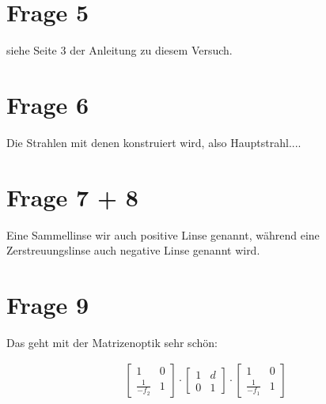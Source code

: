 \section{Frage 5}

siehe Seite 3 der Anleitung zu diesem Versuch.


\section{Frage 6}

Die Strahlen mit denen konstruiert wird, also Hauptstrahl....


\section{Frage 7 + 8}

Eine Sammellinse wir auch positive Linse genannt, während eine Zerstreuungslinse auch negative Linse genannt wird.


\section{Frage 9}

Das geht mit der Matrizenoptik sehr schön:

\begin{align*}
\left[
\begin{array}{cc}
1 & 0 \\ 
\frac{1}{-f_2}& 1 
\end{array} 
\right]
\cdot
\left[
\begin{array}{cc}
1 & d \\ 
0 & 1 
\end{array} 
\right]
\cdot
\left[
\begin{array}{cc}
1 & 0 \\ 
\frac{1}{-f_1}& 1 
\end{array} 
\right]
\end{align*}


